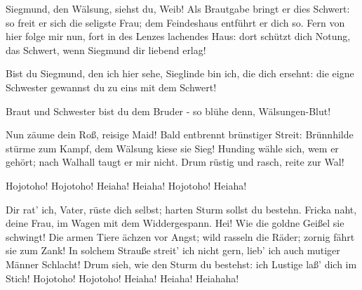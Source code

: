 \begin{drama}
Siegmund, den Wälsung, siehst du, Weib!
Als Brautgabe bringt er dies Schwert:
so freit er sich
die seligste Frau;
dem Feindeshaus entführt er dich so.
Fern von hier folge mir nun,
fort in des Lenzes lachendes Haus:
dort schützt dich Notung, das Schwert,
wenn Siegmund dir liebend erlag!
 




\Sieglindespeaks


Bist du Siegmund, den ich hier sehe,
Sieglinde bin ich, die dich ersehnt:
die eigne Schwester
gewannst du zu eins mit dem Schwert!
 

\Siegmundspeaks
Braut und Schwester bist du dem Bruder -
so blühe denn, Wälsungen-Blut!
 




\act

\scene



\Wotanspeaks
Nun zäume dein Roß, reisige Maid!
Bald entbrennt brünstiger Streit:
Brünnhilde stürme zum Kampf,
dem Wälsung kiese sie Sieg!
Hunding wähle sich, wem er gehört;
nach Walhall taugt er mir nicht.
Drum rüstig und rasch, reite zur Wal!
 

\Brunnhildespeaks


Hojotoho! Hojotoho!
Heiaha! Heiaha! Hojotoho! Heiaha!
 



Dir rat' ich, Vater, rüste dich selbst;
harten Sturm sollst du bestehn.
Fricka naht, deine Frau,
im Wagen mit dem Widdergespann.
Hei! Wie die goldne Geißel sie schwingt!
Die armen Tiere ächzen vor Angst;
wild rasseln die Räder;
zornig fährt sie zum Zank!
In solchem Strauße streit' ich nicht gern,
lieb' ich auch mutiger Männer Schlacht!
Drum sieh, wie den Sturm du bestehst:
ich Lustige laß' dich im Stich!
Hojotoho! Hojotoho!
Heiaha! Heiaha!
Heiahaha!
 



\end{drama}
